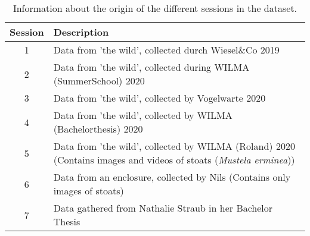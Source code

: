\begin{table}[ht]
\centering
\caption{Information about the origin of the different sessions in the dataset.}
\label{tab:session_info}
\begin{tabular}{c p{12cm}}
\toprule
Session & Description \\
\midrule
1 & Data from 'the wild', collected durch Wiesel\&Co 2019 \\
2 & Data from 'the wild', collected during WILMA (SummerSchool) 2020 \\
3 & Data from 'the wild', collected by Vogelwarte 2020 \\
4 & Data from 'the wild', collected by WILMA (Bachelorthesis) 2020 \\
5 & Data from 'the wild', collected by WILMA (Roland) 2020 (Contains images and videos of stoats (\textit{Mustela erminea})) \\
6 & Data from an enclosure, collected by Nils (Contains only images of stoats) \\
7 & Data gathered from Nathalie Straub in her Bachelor Thesis \\
\bottomrule
\end{tabular}
\end{table}
